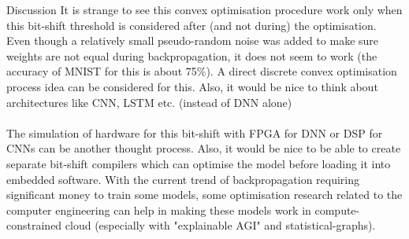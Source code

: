 \documentclass{article}
\begin{document}
	\begin{section}{Discussion}
		It is strange to see this convex optimisation procedure work only when this bit-shift threshold is considered after (and not during) the optimisation. Even though a relatively small pseudo-random noise was added to make sure weights are not equal during backpropagation, it does not seem to work (the accuracy of MNIST for this is about 75\%). A direct discrete convex optimisation process idea can be considered for this. Also, it would be nice to think about architectures like CNN, LSTM etc. (instead of DNN alone)\\\\
		
		The simulation of hardware for this bit-shift with FPGA for DNN or DSP for CNNs can be another thought process. Also, it would be nice to be able to create separate bit-shift compilers which can optimise the model before loading it into embedded software. With the current trend of backpropagation requiring significant money to train some models, some optimisation research related to the computer engineering can help in making these models work in compute-constrained cloud (especially with "explainable AGI" and statistical-graphs).\\\\
		

\end{section}
\end{document}
